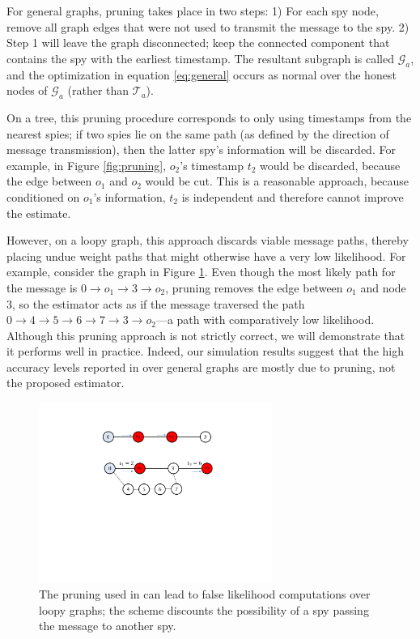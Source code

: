 For general graphs, pruning takes place in two steps: 1) For each spy node, remove all graph edges that were not used to transmit the message to the spy. 2) Step 1 will leave the graph disconnected; keep the connected component that contains the spy with the earliest timestamp. The resultant subgraph is called $\mathcal G_a$, and the optimization in equation \ref{eq:general} occurs as normal over the honest nodes of $\mathcal G_a$ (rather than $\mathcal T_a$). 

On a tree, this pruning procedure corresponds to only using timestamps from the nearest spies; if two spies lie on the same path (as defined by the direction of message transmission), then the latter spy's information will be discarded. For example, in Figure \ref{fig:pruning}, $o_2$'s timestamp $t_2$ would be discarded, because the edge between $o_1$ and $o_2$ would be cut. This is a reasonable approach, because conditioned on $o_1$'s information, $t_2$ is independent and therefore cannot improve the estimate. 

However, on a loopy graph, this approach discards viable message paths, thereby placing undue weight paths that might otherwise have a very low likelihood. For example, consider the graph in Figure \ref{fig:pruning2}. Even though the most likely path for the message is $0\rightarrow o_1\rightarrow 3 \rightarrow o_2$, pruning removes the edge between $o_1$ and node $3$, so the estimator acts as if the message traversed the path $0\rightarrow 4\rightarrow 5 \rightarrow 6 \rightarrow 7 \rightarrow 3 \rightarrow o_2$---a path with comparatively low likelihood. Although this pruning approach is not strictly correct, we will demonstrate that it performs well in practice. Indeed, our simulation results suggest that the high accuracy levels reported in \cite{pinto} over general graphs are mostly due to pruning, not the proposed estimator.
\begin{figure}[h]
\centering
\includegraphics[width= 3in]{figures/pruning2}
\caption{The pruning used in \cite{pinto} can lead to false likelihood computations over loopy graphs; the scheme discounts the possibility of a spy passing the message to another spy.
}
\label{fig:pruning2}
\end{figure}

